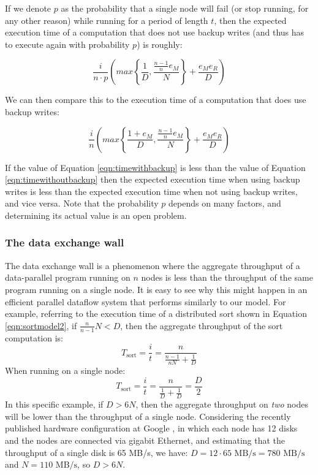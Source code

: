 \documentclass[ 11pt, letterpaper]{article}%
\begin{document}
If we denote $p$ as the probability that a single node will fail (or stop
running, for any other reason) while running for a period of length $t$, then
the expected execution time of a computation that does not use backup
writes (and thus has to execute again with probability $p$) is roughly:

\begin{equation}
\frac{i}{n \cdot p} \left( max\left\{\frac{1}{D},
\frac{\frac{n-1}{n} e_M}{N}\right\} + \frac{e_M e_R}{D} \right)
\label{eqn:timewithoutbackup}
\end{equation}

We can then compare this to the execution time of a computation that does use
backup writes:

\begin{equation}
\frac{i}{n} \left( max\left\{\frac{1+e_M}{D},
\frac{\frac{n-1}{n} e_M}{N}\right\} + \frac{e_M e_R}{D} \right)
\label{eqn:timewithbackup}
\end{equation}

If the value of Equation \ref{eqn:timewithbackup} is less than the value of
Equation \ref{eqn:timewithoutbackup} then the expected execution time when
using backup writes is less than the expected execution time when not using
backup writes, and vice versa. Note that the probability $p$ depends on many
factors, and determining its actual value is an open problem.

\subsubsection{The data exchange wall}

The data exchange wall is a phenomenon where the aggregate throughput of a
data-parallel program running on $n$ nodes is less than the throughput of the
same program running on a single node. It is easy to see why this might happen
in an efficient parallel dataflow system that performs similarly to our model.
For example, referring to the execution time of a distributed sort shown in
Equation \ref{eqn:sortmodel2}, if $\frac{n}{n-1} N < D$, then the aggregate
throughput of the sort computation is: \[T_\text{sort} = \frac{i}{t} =
\frac{n}{\frac{n-1}{n N} + \frac{1}{D}}\] When running on a single node:
\[T_\text{sort} = \frac{i}{t} = \frac{n}{\frac{1}{D} + \frac{1}{D}} =
\frac{D}{2}\] In this specific example, if $D > 6 N$, then the aggregate
throughput on \emph{two} nodes will be lower than the throughput of a single
node. Considering the recently published hardware configuration at Google
\cite{sorting1pb}, in which each node has 12 disks and the nodes are connected
via gigabit Ethernet, and estimating that the throughput of a single disk is 65
MB/s, we have: $D = 12 \cdot 65 \text{ MB/s} = 780 \text{ MB/s}$ and $N = 110
\text{ MB/s}$, so $D > 6 N$.
\end{document}
